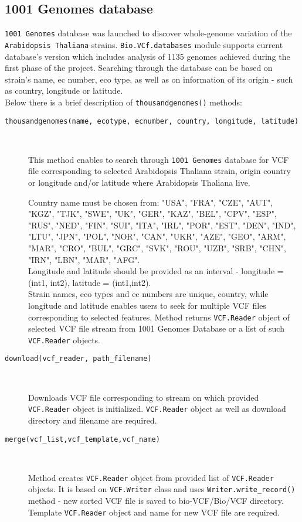 \subsection{1001 Genomes database}
\label{sec:object}


\verb|1001 Genomes| database was launched to discover whole-genome variation of the \verb|Arabidopsis Thaliana| strains.
\verb|Bio.VCf.databases| module supports current database's version which includes analysis of 1135 genomes achieved
during the first phase of the project.
Searching through the database can be based on strain's name, ec number, eco type, as well as on information of its
origin - such as country, longitude or latitude.\\


\noindent Below there is a brief description of \verb|thousandgenomes()| methods:


\begin{description}
  \item[\texttt{thousandgenomes(name, ecotype, ecnumber, country, longitude, latitude)}] \

    This method enables to search through \verb|1001 Genomes| database for VCF file corresponding to selected
    Arabidopsis Thaliana strain, origin country or longitude and/or latitude where Arabidopsis Thaliana live.

    Country name must be chosen from: "USA", "FRA", "CZE", "AUT", "KGZ", "TJK", "SWE", "UK", "GER", "KAZ",
    "BEL", "CPV", "ESP", "RUS", "NED", "FIN", "SUI", "ITA", "IRL", "POR", "EST", "DEN", "IND", "LTU", "JPN", "POL", "NOR",
    "CAN", "UKR", "AZE", "GEO", "ARM", "MAR", "CRO", "BUL", "GRC", "SVK", "ROU", "UZB", "SRB", "CHN", "IRN", "LBN", "MAR",
    "AFG".\\
\vspace{5mm}
    Longitude and latitude should be provided as an interval - longitude = (int1, int2), latitude = (int1,int2). \\
    Strain names, eco types and ec numbers are unique, country, while longitude and latitude enables users to seek for
    multiple VCF files corresponding to selected features.
    Method returns \verb|VCF.Reader| object of selected VCF file stream from 1001 Genomes Database or a list of
    such \verb|VCF.Reader| objects.

\item[\texttt{download(vcf\_reader, path\_filename)}] \

    Downloads VCF file corresponding to stream on which provided \verb|VCF.Reader| object is initialized.
    \verb|VCF.Reader| object as well as download directory and filename are required.

\item[\texttt{merge(vcf\_list,vcf\_template,vcf\_name)}] \

    Method creates \verb|VCF.Reader| object from provided list of \verb|VCF.Reader| objects.
    It is based on \verb|VCF.Writer| class and uses \verb|Writer.write_record()| method - new sorted VCF file is saved to
    bio-VCF/Bio/VCF directory.
    Template \verb|VCF.Reader| object and name for new VCF file are required.

\end{description}

